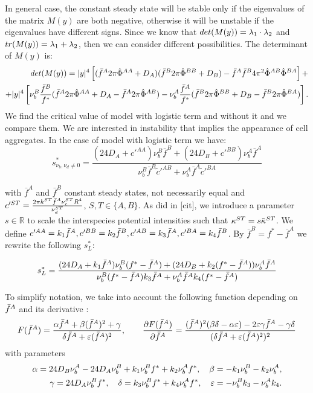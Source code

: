 In general case, the constant steady state will be stable only if the eigenvalues of the matrix $M(y)$ are both negative, otherwise it will be unstable if the eigenvalues have different signs. Since we know that $det(M(y))={\lambda}_1 \cdot {\lambda}_2$ and $tr(M(y))={\lambda}_1+{\lambda}_2$, then we can consider different possibilities.
The determinant of $M(y)$ is:
\begin{align}
det(M(y))=|y|^4 \left[ ({\bar{f}^A} 2\pi {\hat{\Phi}^{AA}} +D_A)({\bar{f}^B} 2\pi {\hat{\Phi}^{BB}} +D_B) - {\bar{f}^A} {\bar{f}^B} 4 \pi^2 {\hat{\Phi}^{AB}} {\hat{\Phi}^{BA}} \right] + \\
+|y|^4 \left[ \nu_b^B \frac{{\bar{f}^B}}{f^{*}}({\bar{f}^A} 2\pi {\hat{\Phi}^{AA}} + D_A -{\bar{f}^A} 2\pi {\hat{\Phi}^{AB}}) - \nu_b^A \frac{{\bar{f}^A}}{f^{*}}({\bar{f}^B} 2\pi {\hat{\Phi}^{BB}} + D_B -{\bar{f}^B} 2\pi {\hat{\Phi}^{BA}})   \right].
\end{align}
We find the critical value of model with logistic term and without it and we compare them. We are interested in instability that implies the appearance of cell aggregates. In the case of model with logistic term we have:
\begin{equation}
s^{*}_{\nu_b,\nu_d \ne 0}=\frac{(24 D_A+c'^{AA})\nu_{b}^{B}\bar{f}^{B}+(24 D_B+c'^{BB})\nu_{b}^{A}\bar{f}^A}{\nu_{b}^{B}\bar{f}^B\tilde{c}'^{AB}+\nu_{b}^{A}\bar{f}^A\tilde{c}'^{BA}}
\end{equation}

with $\bar{f}^A$ and $\bar{f}^B$ constant steady states, not necessarily equal and 
$c'^{ST}=\frac{2\pi k^{ST} {\bar{f}^A} \nu_c^{ST} R^{4}}{\nu_d^{ST}}$, $S,T \in \{ A,B \}$.
As did in [cit], we introduce a parameter $s\in \mathbb{R}$ to scale the interspecies potential intensities such that $\kappa^{ST}=s\tilde{\kappa}^{ST} $. 
We define $c'^{AA}=k_1 {\bar{f}^A}, c'^{BB}=k_2{\bar{f}^B}, c'^{AB}=k_3{\bar{f}^A}, c'^{BA}=k_4{\bar{f}^B}$.
By $\bar{f}^B=f^*-\bar{f}^A$ we rewrite the following $s^*_{L}$:

\begin{equation}
s^{*}_{L}=\frac{(24 D_A+k_1{\bar{f}^A})\nu_{b}^{B}(f^*-{\bar{f}^A})+(24 D_B+k_2(f^*-{\bar{f}^A}))\nu_{b}^{A}\bar{f}^A}{\nu_{b}^{B}(f^*-{\bar{f}^A})k_3{\bar{f}^A}+\nu_{b}^{A}\bar{f}^Ak_4(f^*-{\bar{f}^A})}
\end{equation}

To simplify notation, we take into account the following function depending on ${\bar{f}^A}$ and its derivative :
$$F({\bar{f}^A})=\frac{{\alpha} {\bar{f}^A} + {\beta} ({\bar{f}^A})^2 + {\gamma}}{{\delta} {\bar{f}^A} + \varepsilon({\bar{f}^A})^2}, \quad\quad 
\frac{{\partial} F({\bar{f}^A})}{{\partial} {\bar{f}^A}}=\frac{({\bar{f}^A})^2({\beta} {\delta}-{\alpha} \varepsilon)-2\varepsilon {\gamma} {\bar{f}^A} - {\gamma}{\delta}}{({\delta} {\bar{f}^A}+\varepsilon ({\bar{f}^A})^2)^2}$$ 
with parameters 
\begin{align}
{\alpha}= 24D_B \nu_b^A -24 D_A \nu_b^B +k_1 \nu_b^B f^* + k_2 \nu_b^A f^*, \quad
{\beta}=-k_1 \nu_b^B -k_2 \nu_b^A, \\
{\gamma}= 24 D_A \nu_b^B f^*, \quad 
{\delta}= k_3\nu_b^B f^*+k_4 \nu_b^A f^*, \quad
\varepsilon= -\nu_b^B k_3-	\nu_b^A k_4.
\end{align}

